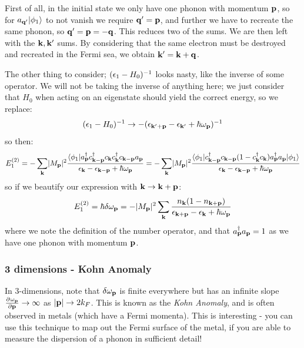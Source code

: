 First of all, in the initial state we only have one phonon with momentum $\mathbf{p}$, so for $a_{\mathbf{q}'}\lvert \phi_1 \rangle$ to not vanish we require $\mathbf{q}' = \mathbf{p}$, and further we have to recreate the same phonon, so $\mathbf{q}' = \mathbf{p} = -\mathbf{q}$. This reduces two of the sums. We are then left with the $\mathbf{k}, \mathbf{k}'$ sums. By considering that the same electron must be destroyed and recreated in the Fermi sea, we obtain $\mathbf{k}' = \mathbf{k} + \mathbf{q}$. 

The other thing to consider; $(\epsilon_1 - H_0)^{-1}$ looks nasty, like the inverse of some operator. We will not be taking the inverse of anything here; we just consider that $H_0$ when acting on an eigenstate should yield the correct energy, so we replace:
\begin{equation}
    (\epsilon_1 - H_0)^{-1} \to -(\epsilon_{\mathbf{k}' + \mathbf{p}} - \epsilon_{\mathbf{k}'} + \hbar \omega_{\mathbf{p}})^{-1}
\end{equation}
so then:
\begin{equation}
    E_1^{(2)} = -\sum_{\mathbf{k}}\lvert M_{\mathbf{p}} \rvert^2 \frac{\langle \phi_1 \rvert a^\dagger_{\mathbf{p}} c^\dagger_{\mathbf{k} - \mathbf{p}}c_{\mathbf{k}}c^\dagger_{\mathbf{k}} c_{\mathbf{k} - \mathbf{p}}a_{\mathbf{p}}}{\epsilon_{\mathbf{k}} - \epsilon_{\mathbf{k} - \mathbf{p}} + \hbar \omega_{\mathbf{p}}} = -\sum_{\mathbf{k}}\lvert M_{\mathbf{p}} \rvert^2 \frac{\langle \phi_1 \rvert c^\dagger_{\mathbf{k} - \mathbf{p}}c_{\mathbf{k} - \mathbf{p}}(1 - c^\dagger_{\mathbf{k}}c_{\mathbf{k}})a^\dagger_{\mathbf{p}}a_{\mathbf{p}} \lvert \phi_1 \rangle}{\epsilon_{\mathbf{k}} - \epsilon_{\mathbf{k} - \mathbf{p}} + \hbar \omega_{\mathbf{p}}}
\end{equation}
so if we beautify our expression with $\mathbf{k} \to \mathbf{k} + \mathbf{p}$:
\begin{equation}
    E_1^{(2)} = \hbar \delta \omega_{\mathbf{p}} = -\lvert M_{\mathbf{p}} \rvert^2 \sum_{\mathbf{k}}\frac{n_{\mathbf{k}}(1 - n_{\mathbf{k} + \mathbf{p}})}{\epsilon_{\mathbf{k} + \mathbf{p}} - \epsilon_{\mathbf{k}} + \hbar\omega_{\mathbf{p}}}
\end{equation}
where we note the definition of the number operator, and that $a^\dagger_{\mathbf{p}}a_{\mathbf{p}} = 1$ as we have one phonon with momentum $\mathbf{p}$. 

\subsubsection{3 dimensions - Kohn Anomaly}
In 3-dimensions, note that $\delta \omega_{\mathbf{p}}$ is finite everywhere but has an infinite slope $\pd{\omega_\v{p}}{\v{p}} \to \infty$ as $\lvert \mathbf{p} \rvert \to 2k_F$. This is known as the \emph{Kohn Anomaly}, and is often observed in metals (which have a Fermi momenta). This is interesting - you can use this technique to map out the Fermi surface of the metal, if you are able to measure the dispersion of a phonon in sufficient detail!

